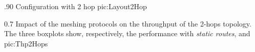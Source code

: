                {.90\columnwidth}
                {Configuration with 2 hop}
                {pic:Layout2Hop}

                {0.7 \columnwidth}
                {Impact of the meshing protocols on the throughput of the
                 2-hops topology. The three boxplots show, respectively,
                 the performance with \emph{static routes}, \emph{\batman}
                 and \emph{\olsr}}
                {pic:Thp2Hops}

\begin{multicols}{2}
\end{multicols}

